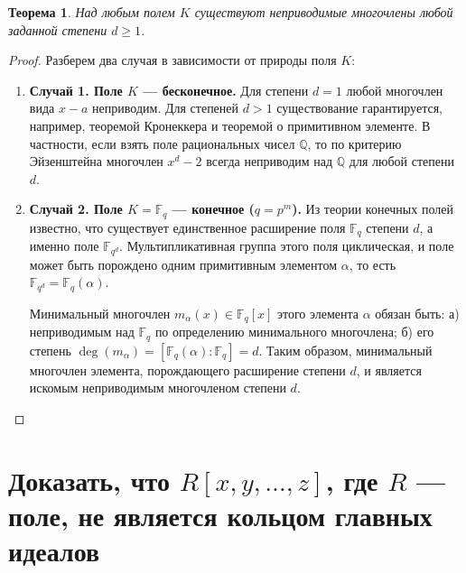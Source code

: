 \documentclass[12pt, a4paper]{article}
\newtheorem{theorem}{Теорема}
\theoremstyle{definition}
\theoremstyle{remark}
\begin{document}
\begin{theorem}
	Над любым полем $K$ существуют неприводимые многочлены любой заданной степени $d \ge 1$.
\end{theorem}
\begin{proof}
	Разберем два случая в зависимости от природы поля $K$:
	\begin{enumerate}
		\item \textbf{Случай 1. Поле $K$ — бесконечное.} 
		Для степени $d=1$ любой многочлен вида $x - a$ неприводим. Для степеней $d > 1$ существование гарантируется, например, теоремой Кронеккера и теоремой о примитивном элементе. В частности, если взять поле рациональных чисел $\mathbb{Q}$, то по критерию Эйзенштейна многочлен $x^d - 2$ всегда неприводим над $\mathbb{Q}$ для любой степени $d$.
		
		\item \textbf{Случай 2. Поле $K = \mathbb{F}_q$ — конечное ($q = p^m$).}
		Из теории конечных полей известно, что существует единственное расширение поля $\mathbb{F}_q$ степени $d$, а именно поле $\mathbb{F}_{q^d}$. Мультипликативная группа этого поля циклическая, и поле может быть порождено одним примитивным элементом $\alpha$, то есть $\mathbb{F}_{q^d} = \mathbb{F}_q(\alpha)$. 
		
		Минимальный многочлен $m_\alpha(x) \in \mathbb{F}_q[x]$ этого элемента $\alpha$ обязан быть:
		а) неприводимым над $\mathbb{F}_q$ по определению минимального многочлена;
		б) его степень $\deg(m_\alpha) = [\mathbb{F}_q(\alpha) : \mathbb{F}_q] = d$.
		Таким образом, минимальный многочлен элемента, порождающего расширение степени $d$, и является искомым неприводимым многочленом степени $d$.
	\end{enumerate}
\end{proof}

\section{Доказать, что $R[x,y,\dots,z]$, где $R$ — поле, не является кольцом главных идеалов}
\end{document}
